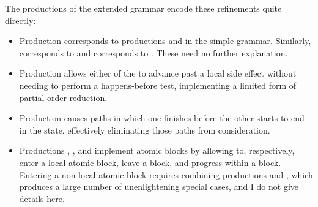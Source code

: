 The productions of the extended grammar encode these refinements quite
directly:
\begin{itemize}
\item Production  corresponds to productions 
  and  in the simple grammar.  Similarly, 
  corresponds to  and  corresponds to
  .  These need no further explanation.
\item Production  allows either of the {\StateMachines}
  to advance past a local side effect without needing to perform a
  happens-before test, implementing a limited form of partial-order
  reduction.
\item Production  causes paths in which one
  {\StateMachine} finishes before the other starts to end in the
  {\stUnreached} state, effectively eliminating those paths from
  consideration.
\item Productions , , and 
  implement atomic blocks by allowing {\StateMachines} to,
  respectively, enter a local atomic block, leave a block, and
  progress within a block.  Entering a non-local atomic block requires
  combining productions  and , which
  produces a large number of unenlightening special cases, and I do
  not give details here.
\end{itemize}
